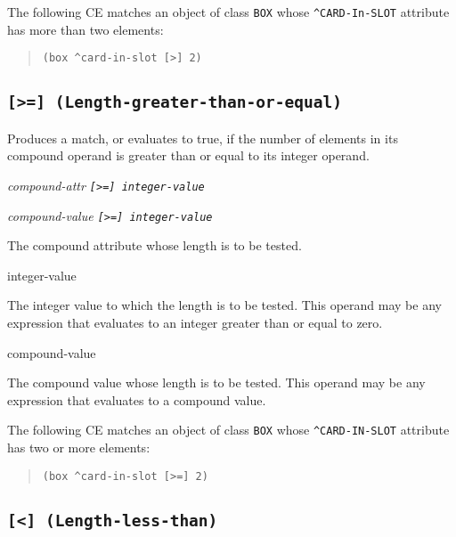 \Example

The following CE matches an object of class \verb|BOX| whose
\verb|^CARD-In-SLOT| attribute has more than two elements:

\begin{quote}
\begin{verbatim}
(box ^card-in-slot [>] 2)
\end{verbatim}
\end{quote}

\subsection{\tt{[>=]} (Length-greater-than-or-equal)}

Produces a match, or evaluates to true, if the number of elements in
its compound operand is greater than or equal to its integer operand.

\Format

\ct\it{compound-attr} \tt{[>=]} \it{integer-value}

\it{compound-value} \tt{[>=]} \it{integer-value}

\begin{operands}
\item[\ct{compound-attr}]

  The compound attribute whose length is to be tested.

\item[integer-value]

  The integer value to which the length is to be tested. This operand
  may be any expression that evaluates to an integer greater than or
  equal to zero.

\item[compound-value]

  The compound value whose length is to be tested. This operand may be
  any expression that evaluates to a compound value.
\end{operands}

\Example

The following CE matches an object of class \verb|BOX| whose
\verb|^CARD-IN-SLOT| attribute has two or more elements:

\begin{quote}
\begin{verbatim}
(box ^card-in-slot [>=] 2)
\end{verbatim}
\end{quote}

\subsection{\tt{[<]} (Length-less-than)}

